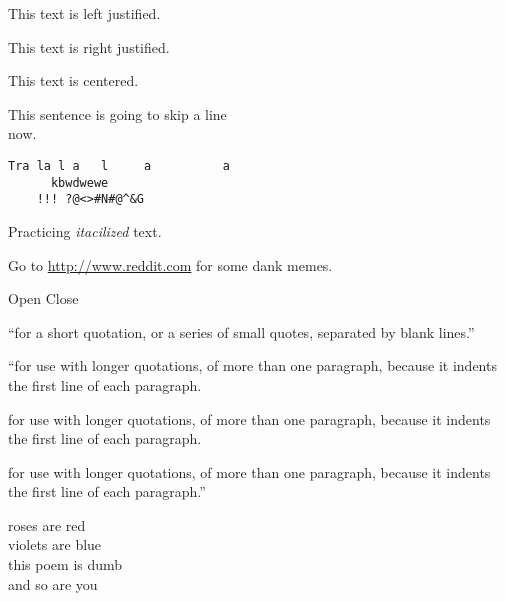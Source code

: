 \documentclass{article}
\begin{document}
{\raggedright{}This text is left justified.}

{\raggedleft{}This text is right justified.}

{\centering{}This text is centered.}

This sentence is going to skip a line \\ now.

\begin{verbatim}
Tra la l a   l     a          a
      kbwdwewe
    !!! ?@<>#N#@^&G
\end{verbatim}

Practicing \emph{itacilized} text.

Go to \url{http://www.reddit.com} for some dank memes.

\begin{listing}{1}
Open
Close
\end{listing}

``for a short quotation, or a series of small quotes, separated by blank lines.''

``for use with longer quotations, of more than one paragraph, because it indents the first line of each paragraph.

for use with longer quotations, of more than one paragraph, because it indents the first line of each paragraph.

for use with longer quotations, of more than one paragraph, because it indents the first line of each paragraph.''


roses are red \\ violets are blue \\ this poem is dumb \\ and so are you
\end{document}
